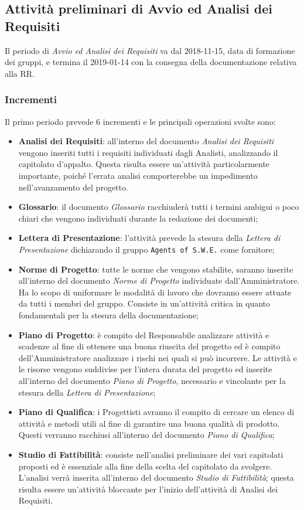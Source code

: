 \subsection{Attività preliminari di Avvio ed Analisi dei Requisiti}

Il periodo di \textit{Avvio ed Analisi dei Requisiti} va dal 2018-11-15, data di formazione dei gruppi, e termina il 2019-01-14 con la consegna della documentazione relativa alla RR.

\newpage
\subsubsection{Incrementi}

Il primo periodo prevede 6 incrementi e le principali operazioni svolte sono: 
\begin{itemize}
	\item \textbf{Analisi dei Requisiti}: all'interno del documento \textit{Analisi dei Requisiti} vengono inseriti tutti i requisiti individuati dagli Analisti, analizzando il capitolato d'appalto. Questa risulta essere un'attività particolarmente importante, poiché l'errata analisi comporterebbe un impedimento nell'avanzamento del progetto.
	\item \textbf{Glossario}: il documento \textit{Glossario} racchiuderà tutti i termini ambigui o poco chiari che vengono individuati durante la redazione dei documenti;
	\item \textbf{Lettera di Presentazione}: l'attività prevede la stesura della \textit{Lettera di Presentazione} dichiarando il gruppo \texttt{Agents of S.W.E.} come fornitore;
	\item \textbf{Norme di Progetto}: tutte le norme che vengono stabilite, saranno inserite all'interno del documento \textit{Norme di Progetto} individuate dall'Amministratore. Ha lo scopo di uniformare le modalità di lavoro che dovranno essere attuate da tutti i membri del gruppo. Consiste in un'attività critica in quanto fondamentali per la stesura della documentazione;
	\item \textbf{Piano di Progetto}: è compito del Responsabile analizzare attività e scadenze al fine di ottenere una buona riuscita del progetto ed è compito dell'Amministratore analizzare i rischi nei quali si può incorrere. Le attività e le risorse vengono suddivise per l'intera durata del progetto ed inserite all'interno del documento \textit{Piano di Progetto}, necessario e vincolante per la stesura della \textit{Lettera di Presentazione};
	\item \textbf{Piano di Qualifica}: i Progettisti avranno il compito di cercare un elenco di attività e metodi utili al fine di garantire una buona qualità di prodotto. Questi verranno racchiusi all'interno del documento \textit{Piano di Qualifica};
	\item \textbf{Studio di Fattibilità}: consiste nell'analisi preliminare dei vari capitolati proposti ed è essenziale alla fine della scelta del capitolato da svolgere. L'analisi verrà inserita all'interno del documento \textit{Studio di Fattibilità}; questa risulta essere un'attività bloccante per l'inizio dell'attività di Analisi dei Requisiti.  
\end{itemize}


